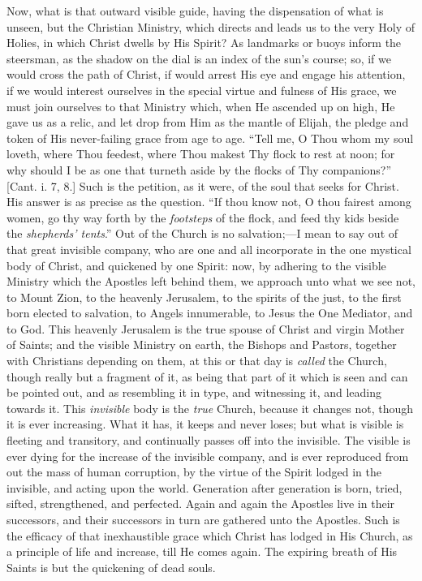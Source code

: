 Now, what is that outward visible guide, having the dispensation of
what is unseen, but the Christian Ministry, which directs and leads us
to the very Holy of Holies, in which Christ dwells by His Spirit? As
landmarks or buoys inform the steersman, as the shadow on the dial is
an index of the sun's course; so, if we would cross the path of
Christ, if would arrest His eye and engage his attention, if we would
interest ourselves in the special virtue and fulness of His grace, we
must join ourselves to that Ministry which, when He ascended up on
high, He gave us as a relic, and let drop from Him as the mantle of
Elijah, the pledge and token of His never-failing grace from age to
age. ``Tell me, O Thou whom my soul loveth, where Thou feedest,
where Thou makest Thy flock to rest at noon; for why should I be as
one that turneth aside by the flocks of Thy companions?'' [Cant. i.
7, 8.] Such is the petition, as it were, of the soul that seeks for
Christ. His answer is as precise as the question. ``If thou know
not, O thou fairest among women, go thy way forth by the \emph{footsteps}
of the flock, and feed thy kids beside the \emph{shepherds' tents}.''
Out of the Church is no salvation;—I mean to say out of that great
invisible company, who are one and all incorporate in the one mystical
body of Christ, and quickened by one Spirit: now, by adhering to the
visible Ministry which the Apostles left behind them, we approach unto
what we see not, to Mount Zion, to the heavenly Jerusalem, to the
spirits of the just, to the first born elected to salvation, to Angels
innumerable, to Jesus the One Mediator, and to God. This heavenly
Jerusalem is the true spouse of Christ and virgin Mother of Saints;
and the visible Ministry on earth, the Bishops and Pastors, together
with Christians depending on them, at this or that day is \emph{called}
the Church, though really but a fragment of it, as being that part of
it which is seen and can be pointed out, and as resembling it in type,
and witnessing it, and leading towards it. This \emph{invisible}
body
is the \emph{true} Church, because it changes not, though it is ever
increasing. What it has, it keeps and never loses; but what is visible
is fleeting and transitory, and continually passes off into the
invisible. The visible is ever dying for the increase of the invisible
company, and is ever reproduced from out the mass of human corruption,
by the virtue of the Spirit lodged in the invisible, and acting upon
the world. Generation after generation is born, tried, sifted,
strengthened, and perfected. Again and again the Apostles live in
their successors, and their successors in turn are gathered unto the
Apostles. Such is the efficacy of that inexhaustible grace which
Christ has lodged in His Church, as a principle of life and increase,
till He comes again. The expiring breath of His Saints is but the
quickening of dead souls.

